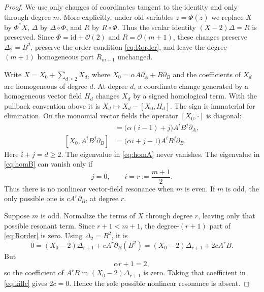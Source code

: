 \documentclass[11pt]{article}
\theoremstyle{remark}
\newcommand{\cO}{\mathcal O}
\begin{document}
\begin{proof}
We use only changes of coordinates tangent to the identity and only through
degree \(m\).  More explicitly, under old variables
\(z=\Phi(\widetilde z)\) we replace \(X\) by \(\Phi^*X\), \(\Delta\) by
\(\Delta\circ\Phi\), and \(R\) by \(R\circ\Phi\).  Thus the scalar identity
\((X-2)\Delta=R\) is preserved.  Since \(\Phi=\mathrm{id}+\cO(2)\) and
\(R=\cO(m+1)\), these changes preserve \(\Delta_2=B^2\), preserve the order
condition \eqref{eq:Rorder}, and leave the degree-\((m+1)\) homogeneous
part \(R_{m+1}\) unchanged.

Write \(X=X_0+\sum_{d\ge2}X_d\), where
\(X_0=\alpha A\partial_A+B\partial_B\) and the coefficients of \(X_d\)
are homogeneous of degree \(d\).  At degree \(d\), a coordinate change
generated by a homogeneous vector field \(H_d\) changes \(X_d\) by a signed
homological term.  With the pullback convention above it is
\(X_d\mapsto X_d-[X_0,H_d]\).  The sign is immaterial for elimination.  On
the monomial vector fields the operator \([X_0,\cdot]\) is diagonal:
\begin{align}
 [X_0,A^iB^j\partial_A]
    &=\bigl(\alpha(i-1)+j\bigr)A^iB^j\partial_A,       \label{eq:homA}\\
 [X_0,A^iB^j\partial_B]
    &=\bigl(\alpha i+j-1\bigr)A^iB^j\partial_B.       \label{eq:homB}
\end{align}
Here \(i+j=d\ge2\).  The eigenvalue in \eqref{eq:homA} never vanishes.
The eigenvalue in \eqref{eq:homB} can vanish only if
\[
             j=0,\qquad i=r:=\frac{m+1}{2}.
\]
Thus there is no nonlinear vector-field resonance when \(m\) is even.  If
\(m\) is odd, the only possible one is
\(cA^r\partial_B\), at degree \(r\).

Suppose \(m\) is odd.  Normalize the terms of \(X\) through degree \(r\),
leaving only that possible resonant term.  Since \(r+1<m+1\), the
degree-\((r+1)\) part of \eqref{eq:Rorder} is zero.  Using
\(\Delta_2=B^2\), it is
\begin{equation}
 0=(X_0-2)\Delta_{r+1}+cA^r\partial_B(B^2)
   =(X_0-2)\Delta_{r+1}+2cA^rB.                       \label{eq:killc}
\end{equation}
But
\[
                         \alpha r+1=2,
\]
so the coefficient of \(A^rB\) in
\((X_0-2)\Delta_{r+1}\) is zero.  Taking that coefficient in
\eqref{eq:killc} gives \(2c=0\).  Hence the sole possible nonlinear
resonance is absent.


\end{proof}
\end{document}
